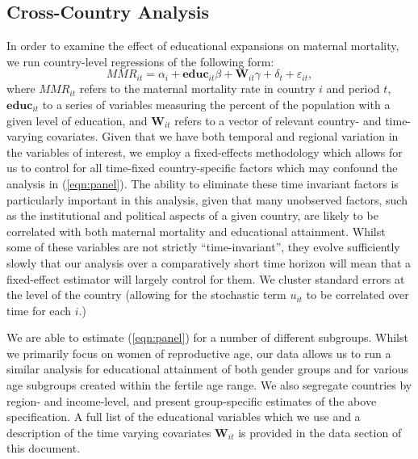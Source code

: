 \documentclass{article}[12pt,subeqn]
\begin{document}
\begin{spacing}{1.4}
\subsection{Cross-Country Analysis}
In order to examine the effect of educational expansions on maternal mortality, we run country-level
regressions of the following form:
\begin{equation}
\label{eqn:panel}
MMR_{it}=\alpha_i+\mathbf{educ}_{it}\beta + \mathbf{W}_{it}\gamma+\delta_t+\varepsilon_{it},
\end{equation}
where $MMR_{it}$ refers to the maternal mortality rate in country $i$ and period $t$, $\mathbf{educ}_{it}$
to a series of variables measuring the percent of the population with a given level of education, and
$\mathbf{W}_{it}$ refers to a vector of relevant country- and time-varying covariates.  Given that we have 
both temporal and regional variation in the variables of interest, we employ a fixed-effects methodology which 
allows for us to control for all time-fixed country-specific factors which may confound the analysis in (\ref{eqn:panel}). 
The ability to eliminate these time invariant factors is particularly important in this analysis, given that 
many unobserved factors, such as the institutional and political aspects of a given country, are likely to be 
correlated with both maternal mortality and educational attainment. Whilst some of these variables are not 
strictly ``time-invariant'', they evolve sufficiently slowly that our analysis over a comparatively short 
time horizon will mean that a fixed-effect estimator will largely control for them. We cluster standard errors 
at the level of the country (allowing for the stochastic term $u_{it}$ to be correlated over time for each $i$.)

We are able to estimate (\ref{eqn:panel}) for a number of different subgroups. Whilst we primarily focus on women 
of reproductive age, our data allows us to run a similar analysis for educational attainment of both gender groups 
and for various age subgroups created within the fertile age range. We also segregate countries by region- and 
income-level, and present group-specific estimates of the above specification. A full list of the educational variables 
which we use and a description of the time varying covariates $\textbf{W}_{it}$ is provided in the data section of this 
document.


\end{spacing}
\end{document}
